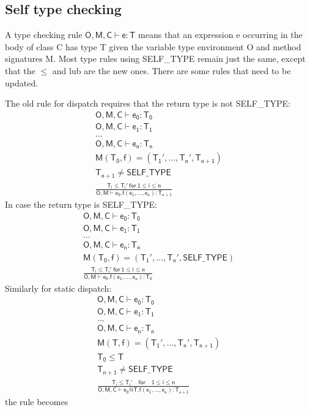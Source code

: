 \subsection{Self type checking}
A type checking rule $\mathsf{O,M,C\vdash e:T}$ means that an expression e occurring in the body of class C has type T given the variable type environment O and method signatures M. Most type rules using SELF\_TYPE remain just the same, except that the $\leq$ and \textsf{lub} are the new ones. There are some rules that need to be updated. 

The old rule for dispatch requires that the return type is not SELF\_TYPE:
\begin{gather*}
\mathsf{O,M,C\vdash e_0:T_0}\\
\mathsf{O,M,C\vdash e_1:T_1}\\
\dots\\
\mathsf{O,M,C\vdash e_n:T_n}\\
\mathsf{M(T_0,f) = (T_1',\dots,T_n', T_{n+1})}\\
\mathsf{T_{n+1}\neq SELF\_TYPE}\\
\mathsf{\frac{T_i\leq T_i'\:for\:1\leq i \leq n}{O,M\vdash e_0.f(e_1,\dots,e_n):T_{n+1}}}
\end{gather*}
In case the return type is SELF\_TYPE:
\begin{gather*}
\mathsf{O,M,C\vdash e_0:T_0}\\
\mathsf{O,M,C\vdash e_1:T_1}\\
\dots\\
\mathsf{O,M,C\vdash e_n:T_n}\\
\mathsf{M(T_0,f) = (T_1',\dots,T_n', SELF\_TYPE)}\\
\mathsf{\frac{T_i\leq T_i'\:for\:1\leq i \leq n}{O,M\vdash e_0.f(e_1,\dots,e_n):T_0}}
\end{gather*}
Similarly for static dispatch:
\begin{gather*}
\mathsf{O,M,C\vdash e_0:T_0}\\
\mathsf{O,M,C\vdash e_1:T_1}\\
\dots\\
\mathsf{O,M,C\vdash e_n:T_n}\\
\mathsf{M(T,f) = (T_1',\dots,T_n',T_{n+1})}\\
\mathsf{T_0\leq T}\\
\mathsf{T_{n+1}\neq SELF\_TYPE}\\
\mathsf{\frac{T_i\leq T_i'\quad for\quad1\leq i \leq n}{O,M,C\vdash e_0@T.f(e_1,\dots,e_n): T_{n+1}}}
\end{gather*}
the rule becomes

